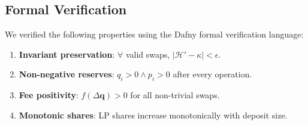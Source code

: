 \subsection{Formal Verification}

We verified the following properties using the Dafny formal verification language:
\begin{enumerate}[leftmargin=1.4em]
    \item \textbf{Invariant preservation}: $\forall$ valid swaps, $|\mathcal{H}' - \kappa| < \epsilon$.
    \item \textbf{Non-negative reserves}: $q_i > 0 \wedge p_i > 0$ after every operation.
    \item \textbf{Fee positivity}: $f(\Delta\bm{q}) > 0$ for all non-trivial swaps.
    \item \textbf{Monotonic shares}: LP shares increase monotonically with deposit size.
\end{enumerate}

